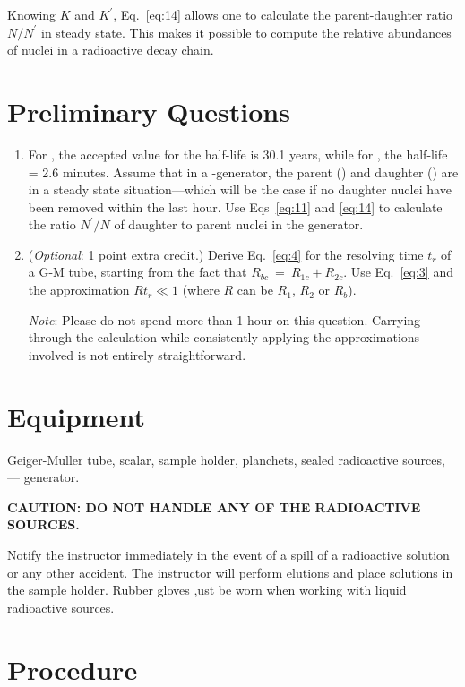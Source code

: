 Knowing $K$ and $K^\prime$, Eq.~\ref{eq:14} allows one to calculate the
parent-daughter ratio $N/N^\prime$ in steady state.  This
makes it possible to compute the relative abundances of nuclei in a
radioactive decay chain.

\section{Preliminary Questions}

\begin{enumerate}
\item For \cs, the accepted value for the half-life is 30.1 years,
while for \bam, the half-life = 2.6 minutes.  Assume that in a \cs-\bam generator,
the parent (\cs) and daughter (\bam) are in a steady state
situation---which will be the case if no daughter nuclei have been
removed within the last hour. Use Eqs~\ref{eq:11} and \ref{eq:14} to calculate the
ratio $N^\prime/N$ of daughter to parent nuclei in the
generator.

\item ({\em Optional}: 1 point extra credit.) Derive Eq.~\ref{eq:4} for the
resolving time $t_r$ of a G-M tube, starting from the fact
that $R_{bc } ~=~  R_{1c } + R_{2c }$.  Use Eq.~\ref{eq:3} and the approximation
$Rt_{r} \ll 1$ (where $R$ can be $R_{1}$, $R_{2}$ or $R_{b}$).

{\em Note}: Please do not spend more than 1 hour on this question.  Carrying
through the calculation while consistently applying the approximations
involved is not entirely straightforward.
\end{enumerate}

\section{Equipment}
Geiger-Muller tube, scalar, sample holder, planchets,
sealed radioactive sources, \cs --- \bam generator.

\bigskip

{\bf CAUTION: DO NOT HANDLE ANY OF THE RADIOACTIVE SOURCES.}

Notify the instructor immediately in the event of a spill of a radioactive
solution or any other accident.  The instructor will perform elutions
and place solutions in the sample holder.  Rubber gloves ,ust be worn
when working with liquid radioactive sources.


\section{Procedure}

